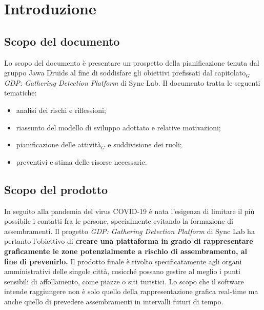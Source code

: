 \chapter{Introduzione}\label{Introduzione}

\section{Scopo del documento}\label{IntorduzioneScopoDelDocumento}
Lo scopo del documento è presentare un prospetto della pianificazione tenuta dal gruppo Jawa Druids al fine di soddisfare gli obiettivi prefissati dal capitolato$_G$ \textit{GDP: Gathering Detection Platform} di Sync Lab. Il documento tratta le seguenti tematiche:
\begin{itemize}
\item analisi dei rischi e riflessioni;
\item riassunto del modello di sviluppo adottato e relative motivazioni;
\item pianificazione delle attività$_G$ e suddivisione dei ruoli;
\item preventivi e stima delle risorse necessarie.
\end{itemize}

\section{Scopo del prodotto}\label{IntroduzioneScopoDelProdotto}
In seguito alla pandemia del virus COVID-19 è nata l'esigenza di limitare il più possibile i contatti fra le persone, specialmente evitando la formazione di assembramenti. Il progetto \textit{GDP: Gathering Detection Platform} di Sync Lab ha pertanto l'obiettivo di \textbf{creare una piattaforma in grado di rappresentare graficamente le zone potenzialmente a rischio di assembramento, al fine di prevenirlo.}
Il prodotto finale è rivolto specificatamente agli organi amministrativi delle singole città, cosicché possano gestire al meglio i punti sensibili di affollamento, come piazze o siti turistici.
Lo scopo che il software intende raggiungere non è solo quello della rappresentazione grafica real-time ma anche quello di prevedere assembramenti in intervalli futuri di tempo.

